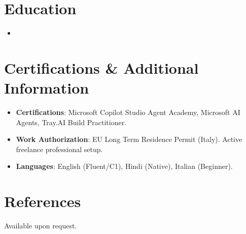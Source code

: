 \documentclass[11pt,a4paper,sans]{moderncv}
\begin{document}
\vspace{3pt}
\section{Education}
\vspace{3pt}
\begin{itemize}
\item{}
\end{itemize}

\vspace{3pt}
\section{Certifications \& Additional Information}
\vspace{3pt}
\begin{itemize}
\item \textbf{Certifications}: Microsoft Copilot Studio Agent Academy, Microsoft AI Agents, Tray.AI Build Practitioner.
\item \textbf{Work Authorization}: EU Long Term Residence Permit (Italy). Active freelance professional setup.
\item \textbf{Languages}: English (Fluent/C1), Hindi (Native), Italian (Beginner).
\end{itemize}

\vspace{3pt}
\section{References}
\vspace{3pt}
Available upon request.
\end{document}
